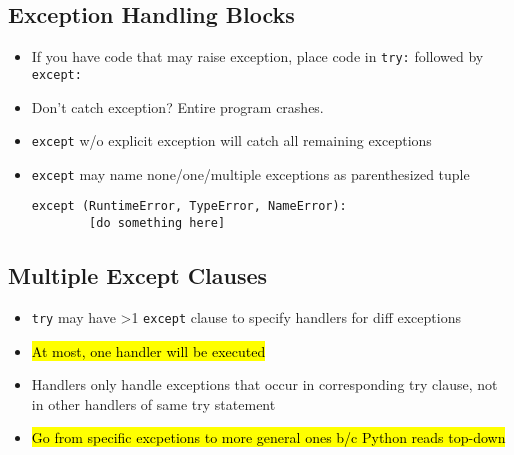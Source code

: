 \documentclass{article}
\begin{document}
\subsection{Exception Handling Blocks}
    \begin{multicols}{2}
        \begin{itemize}
            \item If you have code that may raise exception, place code in \texttt{try:} followed by \texttt{except:}
        \item Don't catch exception? Entire program crashes.
        \item \texttt{except} w/o explicit exception will catch all remaining exceptions
        \item \texttt{except} may name none/one/multiple exceptions as parenthesized tuple
\begin{lstlisting}
except (RuntimeError, TypeError, NameError):
        [do something here]
\end{lstlisting}
        \end{itemize}
    \end{multicols}


\subsection{Multiple Except Clauses}
    \begin{multicols}{2}
        \begin{itemize}
            \item \texttt{try} may have >1 \texttt{except} clause to specify handlers for diff exceptions
            \item \hl{At most, one handler will be executed}
            \item Handlers only handle exceptions that occur in corresponding try clause, not in other handlers of same try statement
            \item \hl{Go from specific excpetions to more general ones b/c Python reads top-down}
        \end{itemize}
    \end{multicols}

\end{document}
